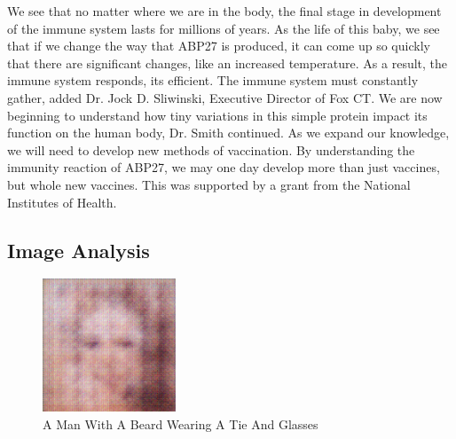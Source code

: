 \documentclass{article}%
\begin{document}
We see that no matter where we are in the body, the final stage in development of the immune system lasts for millions of years. As the life of this baby, we see that if we change the way that ABP27 is produced, it can come up so quickly that there are significant changes, like an increased temperature. As a result, the immune system responds, its efficient. The immune system must constantly gather, added Dr. Jock D. Sliwinski, Executive Director of Fox CT.\newline%
We are now beginning to understand how tiny variations in this simple protein impact its function on the human body, Dr. Smith continued. As we expand our knowledge, we will need to develop new methods of vaccination. By understanding the immunity reaction of ABP27, we may one day develop more than just vaccines, but whole new vaccines.\newline%
This was supported by a grant from the National Institutes of Health.

%
\subsection{Image Analysis}%
\label{subsec:ImageAnalysis}%


\begin{figure}[h!]%
\centering%
\includegraphics[width=150px]{500_fake_images/samples_5_301.png}%
\caption{A Man With A Beard Wearing A Tie And Glasses}%
\end{figure}

%
\end{document}
